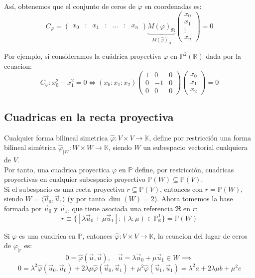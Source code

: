 Así, obtenemos que el conjunto de ceros de $\varphi$ en coordenadas es:
\[
C_\varphi =
\begin{pmatrix}
    x_0 & : & x_1 & : & \ldots & : & x_n
\end{pmatrix}
\underbrace{M(\varphi)_{\mathfrak{R}}}_{M(\hat{\varphi})_B}
\begin{pmatrix}
    x_0 \\ x_1 \\ \vdots \\ x_n
\end{pmatrix}
= 0
\]

Por ejemplo, si consideramos la cuádrica proyectiva $\varphi$ en $\mathbb{P}^2(\mathbb{R})$ dada por la ecuacion:
\[
C_\varphi : x_0^2 - x_1^2 = 0 \iff
\left( x_0 : x_1 : x_2 \right)
\begin{pmatrix}
    1 & 0 & 0 \\
    0 & -1 & 0 \\
    0 & 0 & 0
\end{pmatrix}
\begin{pmatrix}
    x_0 \\ x_1 \\ x_2
\end{pmatrix}
= 0
\]

\subsection{Cuadricas en la recta proyectiva}
Cualquier forma bilineal simetrica $\hat{\varphi} : V \times V \to \mathbb{K}$, define por restricción una forma bilineal simétrica $\hat{\varphi}_{|W} : W \times W \to \mathbb{K}$, siendo $W$ un subespacio vectorial cualquiera de $V$.\\
Por tanto, una cuadrica proyectica $\varphi$ en $\mathbb{P}$ define, por restricción, cuadricas proyectivas en cualquier subespacio proyectivo $\mathbb{P}(W) \subseteq \mathbb{P}(V)$.\\

Si el subespacio es una recta proyectiva $r \subseteq \mathbb{P}(V)$, entonces con $r=\mathbb{P}(W)$, siendo $W = \langle \vec{u}_0, \vec{u}_1 \rangle$ (y por tanto $\dim(W) = 2$). Ahora tomemos la base formada por $\vec{u}_0$ y $\vec{u}_1$, que tiene asociada una referencia $\mathfrak{R}$ en $r$:
\[
    r \equiv \{[\lambda \vec{u}_0 + \mu \vec{u}_1] : 
    (\lambda : \mu) \in \mathbb{P}_\mathbb{K}^1 \} = \mathbb{P}(W)
\]

Si $\varphi$ es una cuadrica en $\mathbb{P}$, entonces $\hat{\varphi} : V \times V \to \mathbb{K}$, la ecuacion del lugar de ceros de $\varphi_{|r}$ es:
\[
0 = \hat{\varphi} (\vec{u}, \vec{u}), \quad 
\vec{u} = \lambda \vec{u}_0 + \mu \vec{u}_1 \in W \implies
\]
\[
    0 = \lambda^2 \hat{\varphi}(\vec{u}_0, \vec{u}_0) +
    2 \lambda \mu \hat{\varphi}(\vec{u}_0, \vec{u}_1) +
    \mu^2 \hat{\varphi}(\vec{u}_1, \vec{u}_1) =
    \lambda^2 a + 2 \lambda \mu b + \mu^2 c
\]

